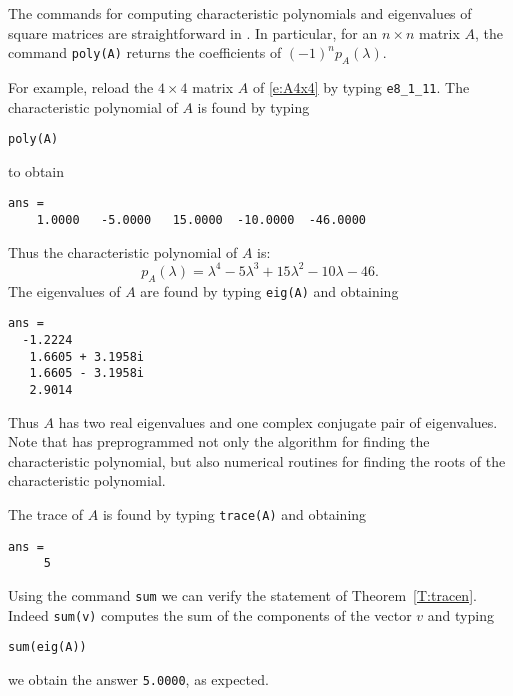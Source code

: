 \documentclass{ximera}
\begin{document}
The commands for computing characteristic polynomials and
eigenvalues of square matrices are straightforward in \Matlab.
In particular, for an $n\times n$ matrix $A$, the \Matlab command
 {\tt poly(A)} returns the coefficients of $(-1)^np_A(\lambda)$.

For example, reload the $4\times 4$ matrix $A$ of \eqref{e:A4x4}
by typing {\tt e8\_1\_11}.  The characteristic polynomial of $A$ is
found by typing
\begin{verbatim}
poly(A)
\end{verbatim} 
to obtain
\begin{verbatim}
ans =
    1.0000   -5.0000   15.0000  -10.0000  -46.0000
\end{verbatim} 
Thus the characteristic polynomial of $A$ is:
\[
p_A(\lambda) = \lambda^4 -5\lambda^3+15\lambda^2-10\lambda-46.
\]
The eigenvalues of $A$ are found by typing {\tt eig(A)} and
obtaining
\begin{verbatim}
ans =
  -1.2224          
   1.6605 + 3.1958i
   1.6605 - 3.1958i
   2.9014 
\end{verbatim}
Thus $A$ has two real eigenvalues and one complex conjugate pair
of eigenvalues.  Note that \Matlab has preprogrammed not only
the algorithm for finding the characteristic polynomial, but
also numerical routines for finding the roots of the
characteristic polynomial.

The trace of $A$ is found by typing {\tt trace(A)} and obtaining
\begin{verbatim} 
ans =
     5
\end{verbatim} 

Using the \Matlab command {\tt sum} we can verify the statement
of Theorem~\ref{T:tracen}.  Indeed {\tt sum(v)} computes the sum 
of the components of the vector $v$ and typing
\begin{verbatim}
sum(eig(A))
\end{verbatim}
we obtain the answer {\tt 5.0000}, as expected.

\EXER

\TEXER
\end{document}
